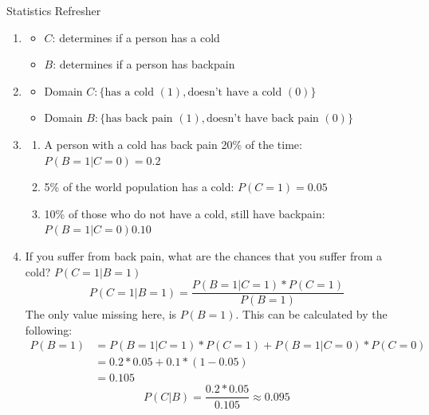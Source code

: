 \documentclass[
	english,
        solution=true
	]{tudaexercise}
\begin{document}
\begin{task}[points=15]{Statistics Refresher}
\begin{subtask}[points=7, title=Conditional Probability]
\begin{solution}

\begin{enumerate}
    \item \begin{itemize}
        \item $C$: determines if a person has a cold
        \item $B$: determines if a person has backpain
    \end{itemize}
    \item \begin{itemize}
        \item Domain $C: \{\text{has a cold } (1), \text{doesn't have a cold }(0)\}$ 
        \item Domain $B: \{\text{has back pain }(1), \text{doesn't have back pain }(0)\}$ 
    \end{itemize}
    \item \begin{enumerate}
        \item A person with a cold has back pain 20\% of the time: $P(B=1|C=0)=0.2$
        \item 5\% of the world population has a cold: $P(C=1)=0.05$
        \item 10\% of those who do not have a cold, still have backpain: $P(B=1|C=0) 0.10$
    \end{enumerate}
    \item If you suffer from back  pain, what are the chances that you suffer from a cold? $P(C=1|B=1)$
    \[P(C=1|B=1)=\frac{P(B=1|C=1)*P(C=1)}{P(B=1)}\]
    The only value missing here, is $P(B=1)$. This can be calculated by the following:
    \begin{align*}
        P(B=1)&=P(B=1|C=1)*P(C=1)+P(B=1|C=0)*P(C=0) \\
        &= 0.2*0.05+0.1*(1-0.05)\\
        &= 0.105
    \end{align*}
    \[P(C|B)=\frac{0.2*0.05}{0.105}\approx0.095\]
\end{enumerate}

\end{solution}

\end{subtask}
\end{task}

\newpage
\end{document}
